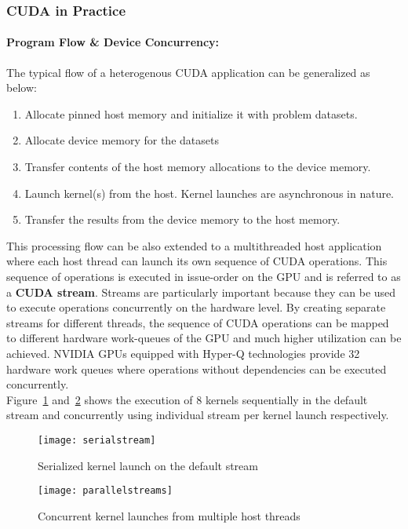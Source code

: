 \documentclass[thesis.tex]{subfiles}
\begin{document}
\subsubsection{CUDA in Practice}
\paragraph{Program Flow \& Device Concurrency:}
The typical flow of a heterogenous CUDA application can be generalized as below:
\begin{enumerate}
	\item Allocate pinned host memory and initialize it with problem datasets.
	\item Allocate device memory for the datasets
	\item Transfer contents of the host memory allocations to the device memory.
	\item Launch kernel(s) from the host. Kernel launches are asynchronous in nature.
	\item Transfer the results from the device memory to the host memory.
\end{enumerate}

This processing flow can be also extended to a multithreaded host application where each host thread can launch its own sequence of CUDA operations. This sequence of operations is executed in issue-order on the GPU and is referred to as a \textbf{CUDA stream}. Streams are particularly important because they can be used to execute operations concurrently on the hardware level. By creating separate streams for different threads, the sequence of CUDA operations can be mapped to different hardware work-queues of the GPU and much higher utilization can be achieved. NVIDIA GPUs equipped with Hyper-Q technologies provide 32 hardware work queues where operations without dependencies can be executed concurrently.\\
Figure~\ref{fig:serialstream} and~\ref{fig:parallelstreams} shows the execution of 8 kernels sequentially in the default stream and concurrently using individual stream per kernel launch respectively. 
\begin{figure}[H]
	\centering
	\texttt{[image: serialstream]}
	\caption{Serialized kernel launch on the default stream}
	\label{fig:serialstream}
\end{figure}

\begin{figure}[H]
	\centering
	\texttt{[image: parallelstreams]}
	\caption{Concurrent kernel launches from multiple host threads}
	\label{fig:parallelstreams}
\end{figure}
\end{document}
